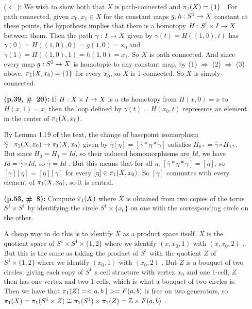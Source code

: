 \ssk

($\Leftarrow$): We wish to show both that $X$ is path-connected and $\pi_1(X)=\{1\}$ . For path
connected, given $x_0,x_1\in X$ for the constant maps $g,h:S^1\rightarrow X$ constant at these points,
the hypothesis implies that there is a homotopy $H:S^!\times I\rightarrow X$ between them. Then the 
path $\gamma:I\rightarrow X$ given by $\gamma(t)=H((1,0),t)$ has $\gamma(0)=H((1,0),0)=g(1,0)=x_0$
and $\gamma(1)=H((1,0),1)=h(1,0)=x_1$. So $X$ is path connected. And since every map $g:S^1\rightarrow X$
is homotopic to any constant map, by (1) $\Rightarrow$ (2) $\Rightarrow$ (3) above,
$\pi_1(X,x_0)=\{1\}$ for every $x_0$, so $X$ is 1-connected. So $X$ is simply-connected.

\msk

{\bf (p.39, \#\ 20):} If $H:X\times I\rightarrow X$ is a cts homotopy
from $H(x,0)=x$ to $H(x,1)=x$, then the loop defined by
$\gamma(t)=H(x_0,t)$ represents an element in the center of $\pi_1(X,x_0)$.

\ssk

By Lemma 1.19 of the text, 
the change of basepoint isomorphism
$\widehat{\gamma}:\pi_1(X,x_0)\rightarrow \pi_1(X,x_0)$ given by
$\widehat{\gamma}[\eta] = [\overline{\gamma}*\eta*\gamma]$
satisfies $H_{0*}=\widehat{\gamma}\circ H_{1*}$. But
since $H_0=H_1=Id$, so their induced homomorphisms
are $Id$, we have $Id=\widehat{\gamma}\circ Id$, so 
$\widehat{\gamma} =Id$ . But this means that
for all $\eta$, $[\overline{\gamma}*\eta*\gamma]=[\eta]$,
so $[\gamma][\eta]=[\eta][\gamma]$ for every $[\eta]\in\pi_1(X,x_0)$.
So $[\gamma]$ commutes with every element of $\pi_1(X,x_0)$,
so it is central.

\msk

{\bf (p.53, \#\ 8):} Compute $\pi_1(X)$ where $X$ is obtained from 
two copies of the torus $S^1\times S^1$ by identifying the
circle $S^1\times\{x_0\}$ on one with the corresponding 
circle on the other.

\ssk

A cheap way to do this is to identify $X$ as a product space
itself. $X$ is the quotient space of $S^1\times S^1\times \{1,2\}$
where we identify $(x,x_0,1)$ with $(x,x_0,2)$ . But this is the 
same as taking the product of $S^1$ with the quotient $Z$ of 
$S^1\times \{1,2\}$ where we identify $(x_0,1)$ with $(x_0,2)$ .
But $Z$ is a bouquet of two circles; giving each copy of $S^1$ a 
cell structure with vertex $x_0$ and one 1-cell, $Z$ then has one vertex
and two 1-cells, which is what a bouquet of two circles is.
Then we have that $\pu(Z)=<a,b\ | > = F(a,b)$ is free on two generators,
so $\pi_1(X) = \pi_1(S^1\times Z)\cong \pi_1(S^1)\times \pi_1(Z) = {\Bbb Z}\times F(a,b)$ .

